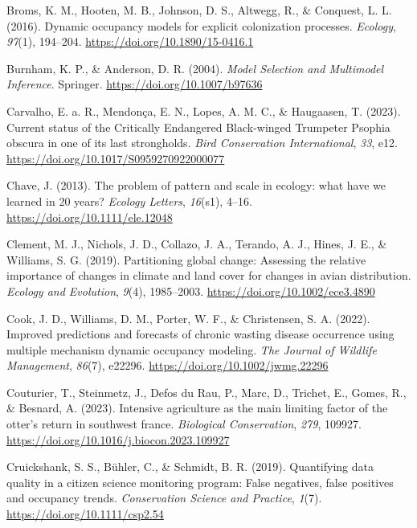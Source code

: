 \documentclass[
]{article}
\newlength{\cslhangindent}
\newenvironment{CSLReferences}[2] %
 {\begin{list}{}{%
  \setlength{\itemindent}{0pt}
  \setlength{\leftmargin}{0pt}
  \setlength{\parsep}{0pt}
  \ifodd #1
   \setlength{\leftmargin}{\cslhangindent}
   \setlength{\itemindent}{-1\cslhangindent}
  \fi
  \setlength{\itemsep}{#2\baselineskip}}}
 {\end{list}}
\begin{document}
\begin{CSLReferences}{1}{0}
Broms, K. M., Hooten, M. B., Johnson, D. S., Altwegg, R., \& Conquest,
L. L. (2016). Dynamic occupancy models for explicit colonization
processes. \emph{Ecology}, \emph{97}(1), 194--204.
\url{https://doi.org/10.1890/15-0416.1}

Burnham, K. P., \& Anderson, D. R. (2004). \emph{Model Selection and
Multimodel Inference}. Springer. \url{https://doi.org/10.1007/b97636}

Carvalho, E. a. R., Mendonça, E. N., Lopes, A. M. C., \& Haugaasen, T.
(2023). Current status of the Critically Endangered Black-winged
Trumpeter Psophia obscura in one of its last strongholds. \emph{Bird
Conservation International}, \emph{33}, e12.
\url{https://doi.org/10.1017/S0959270922000077}

Chave, J. (2013). The problem of pattern and scale in ecology: what have
we learned in 20 years? \emph{Ecology Letters}, \emph{16}(s1), 4--16.
\url{https://doi.org/10.1111/ele.12048}

Clement, M. J., Nichols, J. D., Collazo, J. A., Terando, A. J., Hines,
J. E., \& Williams, S. G. (2019). Partitioning global change: Assessing
the relative importance of changes in climate and land cover for changes
in avian distribution. \emph{Ecology and Evolution}, \emph{9}(4),
1985--2003. \url{https://doi.org/10.1002/ece3.4890}

Cook, J. D., Williams, D. M., Porter, W. F., \& Christensen, S. A.
(2022). Improved predictions and forecasts of chronic wasting disease
occurrence using multiple mechanism dynamic occupancy modeling.
\emph{The Journal of Wildlife Management}, \emph{86}(7), e22296.
\url{https://doi.org/10.1002/jwmg.22296}

Couturier, T., Steinmetz, J., Defos du Rau, P., Marc, D., Trichet, E.,
Gomes, R., \& Besnard, A. (2023). Intensive agriculture as the main
limiting factor of the otter's return in southwest france.
\emph{Biological Conservation}, \emph{279}, 109927.
\url{https://doi.org/10.1016/j.biocon.2023.109927}

Cruickshank, S. S., Bühler, C., \& Schmidt, B. R. (2019). Quantifying
data quality in a citizen science monitoring program: False negatives,
false positives and occupancy trends. \emph{Conservation Science and
Practice}, \emph{1}(7). \url{https://doi.org/10.1111/csp2.54}


\end{CSLReferences}
\end{document}
